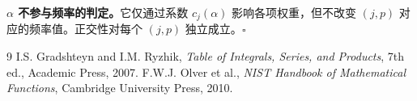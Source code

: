 \documentclass[12pt,a4paper]{ctexart}
\begin{document}
\textbf{$\alpha$ 不参与频率的判定。}它仅通过系数 $c_j(\alpha)$ 影响各项权重，但不改变 $(j,p)$ 对应的频率值。正交性对每个 $(j,p)$ 独立成立。$\square$

\begin{thebibliography}{9}
I.S. Gradshteyn and I.M. Ryzhik, \textit{Table of Integrals, Series, and Products}, 7th ed., Academic Press, 2007.
F.W.J. Olver et al., \textit{NIST Handbook of Mathematical Functions}, Cambridge University Press, 2010.
\end{thebibliography}
\end{document}
